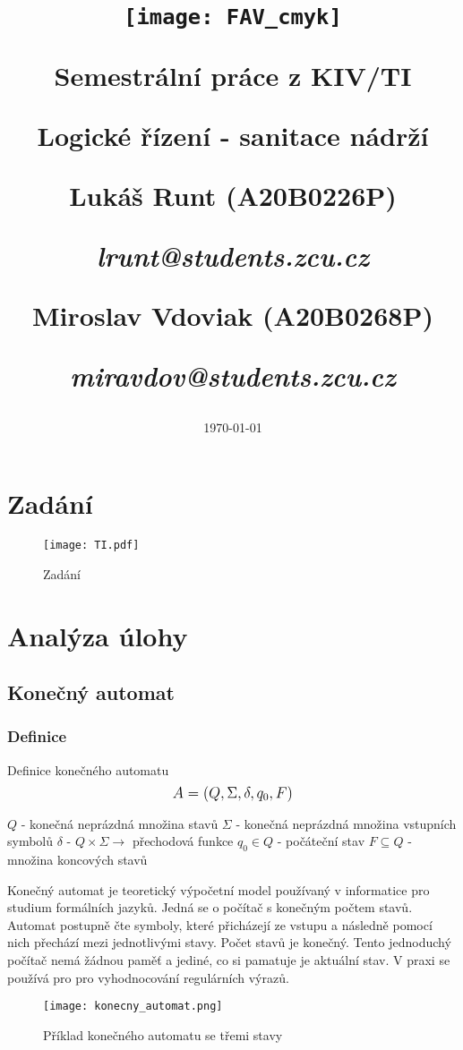 \documentclass[12pt, a4paper]{article}
\title{\texttt{[image: FAV\_cmyk]}

{\huge Semestrální práce z KIV/TI}

\vspace{0.5cm}
{\LARGE Logické řízení - sanitace nádrží}
\vspace{1cm} 

\Large Lukáš Runt (A20B0226P)

\large {\itshape lrunt@students.zcu.cz}

\vspace{0.1cm}
\Large Miroslav Vdoviak (A20B0268P)

\large \itshape{miravdov@students.zcu.cz}
}
\date{\vspace{6cm} \today}
\begin{document}
\begin{titlepage}
\clearpage\maketitle
\thispagestyle{empty}
\end{titlepage}
\tableofcontents

\section{Zadání}
\begin{figure}[H]
    \centering
    \texttt{[image: TI.pdf]}
    \caption{Zadání}
    \label{obr1: Zadání}
\end{figure}

\section{Analýza úlohy}
\subsection{Konečný automat}
\subsubsection{Definice}

\noindent Definice konečného automatu
\[
    \mathlarger{A = (Q, \Sigma, \delta , q_0, F)} 
\]

\noindent$Q$ - konečná neprázdná množina stavů \newline
$\Sigma$ - konečná neprázdná množina vstupních symbolů \newline
$\delta$ - $Q \times \Sigma \rightarrow $ přechodová funkce \newline
$q_0 \in Q $ - počáteční stav \newline
$F\subseteq Q $ - množina koncových stavů \newline

Konečný automat je teoretický výpočetní model používaný v informatice pro studium formálních jazyků. Jedná se o počítač s konečným počtem stavů.
Automat postupně čte symboly, které přicházejí ze vstupu a následně pomocí nich přechází mezi jednotlivými stavy. Počet stavů je konečný. Tento jednoduchý počítač nemá žádnou paměť a jediné,
co si pamatuje je aktuální stav. V praxi se používá pro pro vyhodnocování regulárních výrazů.

\begin{figure}[h!]
    \centering
    \texttt{[image: konecny\_automat.png]}
    \caption{Příklad konečného automatu se třemi stavy}
    \label{konecny_automat: 1}
\end{figure}
\end{document}
